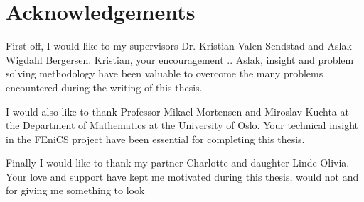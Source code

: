 \section*{Acknowledgements}
First off, I would like to my supervisors Dr. Kristian Valen-Sendstad and Aslak Wigdahl Bergersen. Kristian, your encouragement  .. Aslak, insight and problem solving methodology have been valuable to overcome the many problems encountered during the writing of this thesis.

I would also like to thank Professor Mikael Mortensen and Miroslav Kuchta at the Department of Mathematics at the University of Oslo. Your technical insight in the FEniCS project have been essential for completing this thesis. 

Finally I would like to thank my partner Charlotte and daughter Linde Olivia. Your love and support have kept me motivated during this thesis, would not and for giving me something to look
